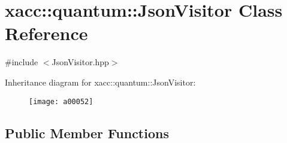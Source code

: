 \hypertarget{a00052}{}\section{xacc\+:\+:quantum\+:\+:Json\+Visitor Class Reference}
\label{a00052}


{\ttfamily \#include $<$Json\+Visitor.\+hpp$>$}

Inheritance diagram for xacc\+:\+:quantum\+:\+:Json\+Visitor\+:\begin{figure}[H]
\begin{center}
\leavevmode
\texttt{[image: a00052]}
\end{center}
\end{figure}
\subsection*{Public Member Functions}
